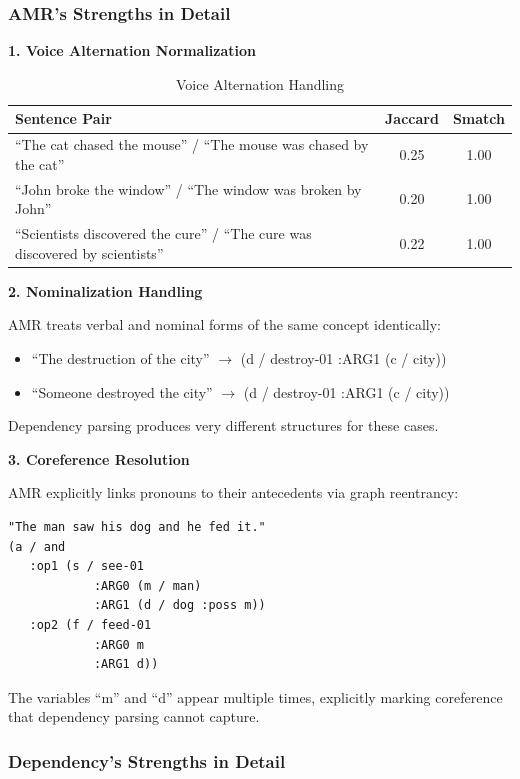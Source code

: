 \documentclass[11pt,a4paper]{article}
\begin{document}
\subsubsection{AMR's Strengths in Detail}

\textbf{1. Voice Alternation Normalization}

\begin{table}[h]
\centering
\caption{Voice Alternation Handling}
\begin{tabular}{p{5cm}cc}
\toprule
\textbf{Sentence Pair} & \textbf{Jaccard} & \textbf{Smatch} \\
\midrule
``The cat chased the mouse'' / ``The mouse was chased by the cat'' & 0.25 & 1.00 \\
``John broke the window'' / ``The window was broken by John'' & 0.20 & 1.00 \\
``Scientists discovered the cure'' / ``The cure was discovered by scientists'' & 0.22 & 1.00 \\
\bottomrule
\end{tabular}
\end{table}

\textbf{2. Nominalization Handling}

AMR treats verbal and nominal forms of the same concept identically:
\begin{itemize}
    \item ``The destruction of the city'' $\to$ (d / destroy-01 :ARG1 (c / city))
    \item ``Someone destroyed the city'' $\to$ (d / destroy-01 :ARG1 (c / city))
\end{itemize}

Dependency parsing produces very different structures for these cases.

\textbf{3. Coreference Resolution}

AMR explicitly links pronouns to their antecedents via graph reentrancy:
\begin{verbatim}
"The man saw his dog and he fed it."
(a / and
   :op1 (s / see-01
            :ARG0 (m / man)
            :ARG1 (d / dog :poss m))
   :op2 (f / feed-01
            :ARG0 m
            :ARG1 d))
\end{verbatim}

The variables ``m'' and ``d'' appear multiple times, explicitly marking coreference that dependency parsing cannot capture.

\subsubsection{Dependency's Strengths in Detail}
\end{document}
